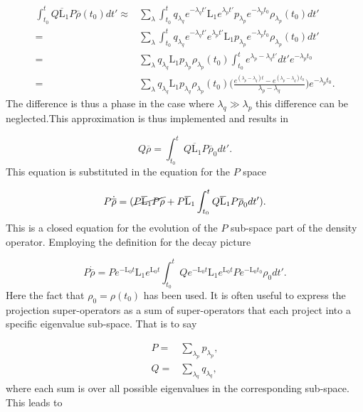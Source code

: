 \documentclass[12pt]{article}
\begin{document}
\begin{align}
  \int_{t_0}^t Q\overline{\mathrm{L}}_1P\overline{\rho}(t_0) dt'\approx&\sum_{\lambda}\int_{t_0}^t q_{\lambda_q} e^{-\lambda_q t'}\mathrm{L}_1e^{\lambda_p t'}p_{\lambda_p} e^{-\lambda_p t_0}\rho_{\lambda_p}(t_0)dt'\\
  =&\sum_{\lambda}\int_{t_0}^t q_{\lambda_q} e^{-\lambda_q t'}e^{\lambda_p t'}\mathrm{L}_1p_{\lambda_p} e^{-\lambda_p t_0}\rho_{\lambda_p}(t_0)dt' \nonumber\\
  =&\sum_{\lambda} q_{\lambda_q}\mathrm{L}_1p_{\lambda_p} \rho_{\lambda_p}(t_0) \int_{t_0}^te^{\lambda_p-\lambda_q t'}dt'e^{-\lambda_p t_0} \nonumber\\
   =&\sum_{\lambda} q_{\lambda_q}\mathrm{L}_1p_{\lambda_q} \rho_{\lambda_p}(t_0) \Bigg(\frac{e^{(\lambda_p-\lambda_q) t}-e^{(\lambda_p-\lambda_q) t_0}}{\lambda_p-\lambda_q}\Bigg)e^{-\lambda_p t_0}. \nonumber
\end{align} The difference is thus a phase in the case where $\lambda_q \gg \lambda_p$ this difference can be neglected.This approximation is thus implemented and results in

\begin{equation}
    Q\overline{\rho} = \int_{t_0}^t Q\overline{\mathrm{L}}_1P\overline{\rho}_0 dt'.
\end{equation} This equation is substituted in the equation for the $P$ space

\begin{equation}
   P\dot{\overline{\rho}} = (\cancel{P\overline{\mathrm{L}}_1P\rho}+P\overline{\mathrm{L}}_1\int_{t_0}^t Q\overline{\mathrm{L}}_1 P\overline{\rho}_0 dt').  
\end{equation} This is a closed equation for the evolution of the $P$ sub-space part of the density operator. Employing the definition for the decay picture

\begin{equation}
   P\dot{\overline{\rho}} = Pe^{-\mathrm{L}_0 t}\mathrm{L}_1e^{\mathrm{L}_0 t}\int_{t_0}^t Qe^{-\mathrm{L}_0 t}\mathrm{L}_1e^{\mathrm{L}_0 t} Pe^{-\mathrm{L}_0 t_0}\rho_0 dt'.  
\end{equation} Here the fact that $\rho_0 = \rho(t_0)$ has been used. It is often useful to express the projection super-operators as a sum of super-operators that each project into a specific eigenvalue sub-space. That is to say

\begin{align}
    P =& \sum_{\lambda_p} p_{\lambda_p},\\
    Q =& \sum_{\lambda_q} q_{\lambda_q},
\end{align} where each sum is over all possible eigenvalues in the corresponding sub-space. This leads to 
\end{document}
